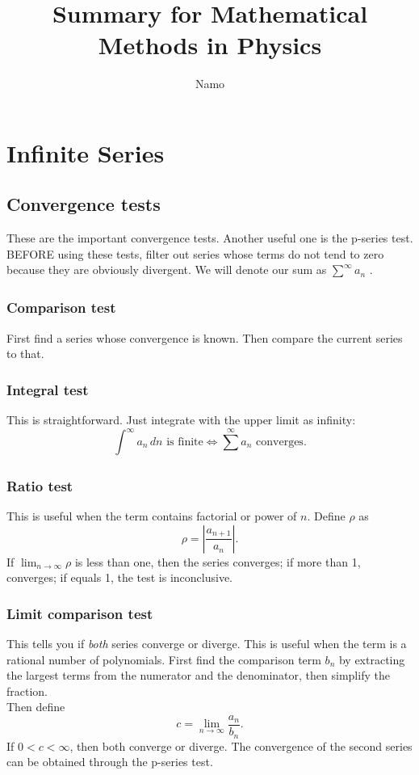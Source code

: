 \documentclass[11pt]{article}
\title{Summary for Mathematical Methods in Physics}
\author{Namo}
\begin{document}
\section{Infinite Series}
\subsection{Convergence tests}
These are the important convergence tests. Another useful one is the p-series test. BEFORE using these tests, filter out series whose terms do not tend to zero because they are obviously divergent. We will denote our sum as $\sum_{}^{\infty} a_n$ .

\subsubsection{Comparison test}
First find a series whose convergence is known. Then compare the current series to that.

\subsubsection{Integral test}
This is straightforward. Just integrate with the upper limit as infinity:
$$\int_{}^{\infty} a_n \,dn \text{ is finite} \iff \sum_{}^{\infty} a_n \text{ converges} .$$

\subsubsection{Ratio test}
This is useful when the term contains factorial or power of $n$. Define $\rho$ as
$$\rho = \left| \frac{a_{n+1}}{a_n} \right| .$$
If $\lim_{n \to \infty} \rho$ is less than one, then the series converges; if more than 1, converges; if equals 1, the test is inconclusive.

\subsubsection{Limit comparison test}
This tells you if \textit{both} series converge or diverge. This is useful when the term is a rational number of polynomials. First find the comparison term $b_n$ by extracting the largest terms from the numerator and the denominator, then simplify the fraction.
\\
Then define
$$c = \lim_{n \to \infty} \frac{a_n}{b_n} .$$
If $0 < c < \infty$, then both converge or diverge. The convergence of the second series can be obtained through the p-series test.
\end{document}
